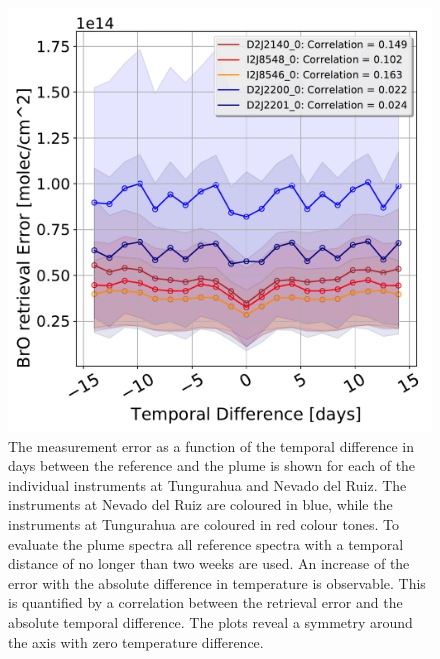 \begin{figure}
	\centering
	\includegraphics[width=0.7\linewidth]{Bilder/DatallInstruments}
	\caption{The  measurement error as a function of the temporal difference in days between the reference and the plume is shown for each of the individual instruments at Tungurahua and Nevado del Ruiz. The instruments at Nevado del Ruiz are coloured in blue, while the instruments at Tungurahua are coloured in red colour tones.  To evaluate the plume spectra all reference spectra with a temporal distance of no longer than two weeks are used. An increase of the  error with the absolute difference in temperature is observable. This is quantified by a correlation between the  retrieval error and the absolute temporal difference. The plots reveal a symmetry around the axis with zero temperature difference.}
	\label{fig:datallinstruments}
\end{figure}

